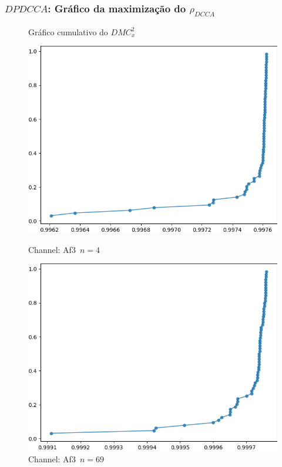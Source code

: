 \documentclass[11pt, aspectratio=169]{beamer}
\newcommand{\dmc}{\(DMC_x^2\) }
\newcommand{\pdcca}{\({\rho}_{DCCA}\) }
\begin{document}
\begin{frame}

  \frametitle{$DPDCCA$: Gráfico da maximização do \pdcca}
\begin{figure}[ht]
  \caption{Gráfico cumulativo do \dmc}
  \begin{minipage}[b]{0.45\textwidth}
    \includegraphics[width=\textwidth]{../Figures/test_dmc/pdcca_of_Af3._n_4.png}
    \caption{Channel: Af3~$n = 4$}
  \end{minipage}
  \hfill
  \begin{minipage}[b]{0.45\textwidth}
    \includegraphics[width=\textwidth]{../Figures/test_dmc/pdcca_of_Af3._n_69.png}
    \caption{Channel: Af3~$n = 69$}
  \end{minipage}
\end{figure}
\end{frame}
\end{document}
